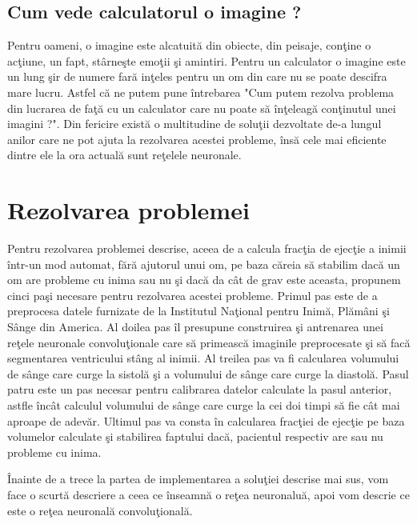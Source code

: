 \subsection{Cum vede calculatorul o imagine ?}

Pentru oameni, o imagine este alcatuit\u{a} din obiecte, din peisaje, con\c{t}ine o ac\c{t}iune, un fapt, st\^{a}rne\c{s}te emo\c{t}ii \c{s}i amintiri. Pentru un calculator o imagine este un lung \c{s}ir de numere far\u{a} in\c{t}eles pentru un om din care nu se poate descifra mare lucru. Astfel c\u{a} ne putem pune \^{i}ntrebarea "Cum putem rezolva problema din lucrarea de fa\c{t}\u{a} cu un calculator care nu poate s\u{a} \^{i}n\c{t}eleag\u{a} con\c{t}inutul unei imagini ?". Din fericire exist\u{a} o multitudine de solu\c{t}ii dezvoltate de-a lungul anilor care ne pot ajuta la rezolvarea acestei probleme, \^{i}ns\u{a} cele mai eficiente dintre ele la ora actual\u{a} sunt re\c{t}elele neuronale.

\section{Rezolvarea problemei}

Pentru rezolvarea problemei descrise, aceea de a calcula frac\c{t}ia de ejec\c{t}ie a inimii \^{i}ntr-un mod automat, f\u{a}r\u{a} ajutorul unui om, pe baza c\u{a}reia s\u{a} stabilim dac\u{a} un om are probleme cu inima sau nu \c{s}i dac\u{a} da c\^{a}t de grav este aceasta, propunem cinci pa\c{s}i necesare pentru rezolvarea acestei probleme. Primul pas este de a preprocesa datele furnizate de la Institutul Na\c{t}ional pentru Inim\u{a}, Pl\u{a}m\^{a}ni \c{s}i S\^{a}nge din America. Al doilea pas \^{i}l presupune construirea \c{s}i antrenarea unei re\c{t}ele neuronale convolu\c{t}ionale care s\u{a} primeasc\u{a} imaginile preprocesate \c{s}i s\u{a} fac\u{a} segmentarea ventricului st\^{a}ng al inimii. Al treilea pas va fi calcularea volumului de s\^{a}nge care curge la sistol\u{a} \c{s}i a volumului de s\^{a}nge care curge la diastol\u{a}. Pasul patru este un pas necesar pentru calibrarea datelor calculate la pasul anterior, astfle \^{i}nc\^{a}t calculul volumului de s\^{a}nge care curge la cei doi timpi s\u{a} fie c\^{a}t mai aproape de adev\u{a}r. Ultimul pas va consta \^{i}n calcularea frac\c{t}iei de ejec\c{t}ie pe baza volumelor calculate \c{s}i stabilirea faptului dac\u{a}, pacientul respectiv are sau nu probleme cu inima. 

\par

\^{I}nainte de a trece la partea de implementarea a solu\c{t}iei descrise mai sus, vom face o scurt\u{a} descriere a ceea ce \^{i}nseamn\u{a} o re\c{t}ea neuronalu\u{a}, apoi vom descrie ce este o re\c{t}ea neuronal\u{a} convolu\c{t}ional\u{a}.